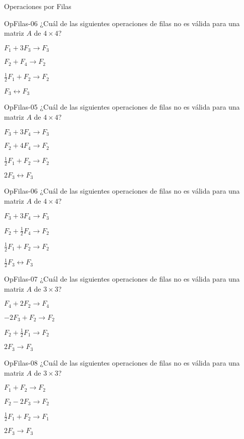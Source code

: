 \documentclass[a4,11pt]{aleph-notas}
\begin{document}
\begin{quiz}{Operaciones por Filas}
\begin{multi}[]%
    {OpFilas-06}
    ¿Cuál de las siguientes operaciones de filas no es válida para una matriz $A$ de $4\times 4$?
    \item* $F_1+3F_3\to F_3$
    \item $F_2+F_4\to F_2$
    \item $\frac{1}{2}F_1+F_2\to F_2$
    \item $F_3\leftrightarrow F_3$
\end{multi}

\begin{multi}[]%
    {OpFilas-05}
    ¿Cuál de las siguientes operaciones de filas no es válida para una matriz $A$ de $4\times 4$?
    \item $F_3+3F_4\to F_3$
    \item $F_2+4F_4\to F_2$
    \item $\frac{1}{2}F_1+F_2\to F_2$
    \item* $2F_3\leftrightarrow F_3$
\end{multi}

\begin{multi}[]%
    {OpFilas-06}
    ¿Cuál de las siguientes operaciones de filas no es válida para una matriz $A$ de $4\times 4$?
    \item $F_3+3F_4\to F_3$
    \item $F_2+\frac{1}{2}F_4\to F_2$
    \item $\frac{1}{2}F_1+F_2\to F_2$
    \item* $\frac{1}{2}F_3\leftrightarrow F_3$
\end{multi}

\begin{multi}[]%
    {OpFilas-07}
    ¿Cuál de las siguientes operaciones de filas no es válida para una matriz $A$ de $3\times 3$?
    \item* $F_4+2F_2\to F_4$
    \item $-2F_3+F_2\to F_2$
    \item $F_2+\frac{1}{2}F_1\to F_2$
    \item $2F_3\to F_3$
\end{multi}

\begin{multi}[]%
    {OpFilas-08}
    ¿Cuál de las siguientes operaciones de filas no es válida para una matriz $A$ de $3\times 3$?
    \item $F_1+F_2\to F_2$
    \item $F_2-2F_3\to F_2$
    \item* $\frac{1}{2}F_1+F_2\to F_1$
    \item $2F_3\to F_3$
\end{multi}


\end{quiz}
\end{document}
